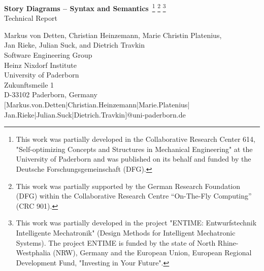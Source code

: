 \documentclass[12pt,a4paper,twoside,titlepage,openright,headsepline,listof=totoc,index=totoc,chapterprefix,bibliography=totoc]{scrreprt}
\theoremstyle{break}
\begin{document}


	\setcounter{page}{1}

	\begin{titlepage}
	\thispagestyle{empty}
	{\center

			\vspace{1.5cm}
            {\LARGE  {\bf Story Diagrams -- Syntax and Semantics}\,
             \footnote{This work was partially developed in the Collaborative Research Center %
             614, "Self-optimizing Concepts and Structures in Mechanical Engineering" at the University of Paderborn
             and was published on its behalf and funded by the Deutsche Forschungsgemeinschaft (DFG).}
             \footnote{This work was partially supported by the German Research Foundation (DFG) within the 
             Collaborative Research Centre ``On-The-Fly Computing'' (CRC 901).}
             \footnote{This work was partially developed in the project "ENTIME: Entwurfstechnik Intelligente Mechatronik" (Design Methods for Intelligent Mechatronic Systems).
             The project ENTIME is funded by the state of North Rhine-Westphalia (NRW), Germany and the European Union, European Regional Development Fund, "Investing in Your Future".}}
			\\
			\vspace{1.5cm}
			{\Large Technical Report} \\
			\vspace{1.25cm}
			 
			
			Markus von Detten, Christian Heinzemann, Marie Christin Platenius, \\
			Jan Rieke, Julian Suck, and Dietrich Travkin \\
			Software Engineering Group\\			
			Heinz Nixdorf Institute\\
			University of Paderborn\\
			Zukunftsmeile 1\\
			D-33102 Paderborn, Germany\\
			$[$Markus.von.Detten|Christian.Heinzemann|Marie.Platenius|\\
			Jan.Rieke|Julian.Suck|Dietrich.Travkin$]$@uni-paderborn.de\\

}
\end{titlepage}
\end{document}
